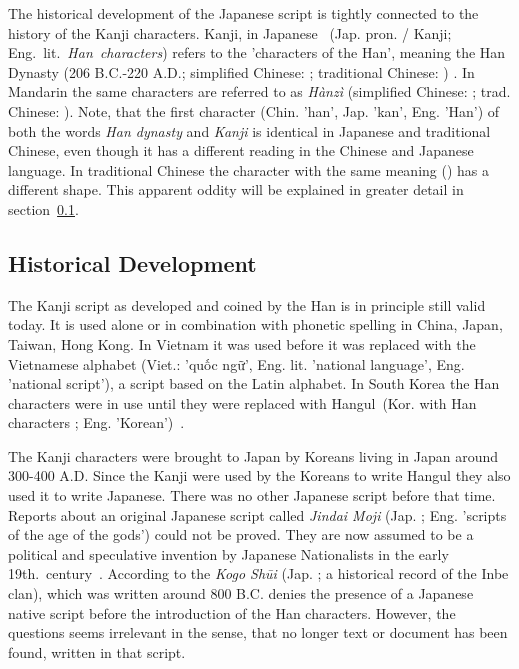 The historical development of the Japanese script is tightly connected to the 
history of the Kanji characters. Kanji, in Japanese 
~(Jap. pron.  / Kanji; Eng.~lit.~\emph{Han~characters}) 
refers to the 'characters of the Han', meaning the Han Dynasty 
(206 B.C.-220 A.D.; simplified Chinese: ; traditional Chinese: 
) . In Mandarin the same characters are 
referred to as \emph{Hànzì} (simplified Chinese: ; 
trad. Chinese: ).
Note, that the first character  (Chin. 'han', Jap. 'kan', Eng. 'Han') 
of both the words \emph{Han dynasty} and \emph{Kanji} is identical in Japanese 
and traditional Chinese, even though it has a different reading in the 
Chinese and Japanese language. In traditional Chinese the character with
the same meaning () has a different shape. This apparent oddity will be 
explained in greater detail in 
section~\ref{sec:historicaldevelopmentofjapanesescript}.

\subsection{Historical Development}
\label{sec:historicaldevelopmentofjapanesescript}

The Kanji script as developed and coined by the Han is in principle still valid 
today. It is used alone or in combination with phonetic spelling in China, Japan,
Taiwan, Hong Kong. In Vietnam it was used before it was replaced with the 
Vietnamese alphabet (Viet.: 'quốc ngữ', Eng. lit. 'national language', Eng. 
'national script'), a script based on the Latin alphabet. In South Korea the Han 
characters were in use until they were replaced with 
Hangul~(Kor. with Han characters ; Eng. 'Korean')~.

The Kanji characters were brought to Japan by Koreans living in Japan around 
300-400 A.D. Since the Kanji were used by the Koreans to write 
Hangul they also used it to write Japanese. There was no other Japanese script 
before that time. Reports about an original Japanese script called 
\emph{Jindai Moji} (Jap. ; Eng. 'scripts of the age of the gods')
could not be proved. They are now assumed to be a political and speculative 
invention by Japanese Nationalists in the early 
19th.~century~. According to 
the \emph{Kogo Shūi} (Jap. ; a historical record of the Inbe clan),
which was written around 800 B.C. denies the presence of a Japanese native
script before the introduction of the Han characters. However, the questions
seems irrelevant in the sense, that no longer text or document has been found,
written in that script.

